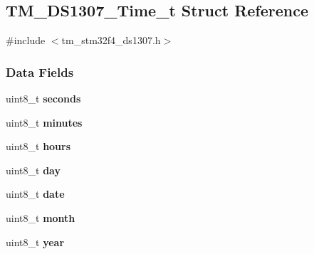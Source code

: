 \hypertarget{struct_t_m___d_s1307___time__t}{}\subsection{T\+M\+\_\+\+D\+S1307\+\_\+\+Time\+\_\+t Struct Reference}
\label{struct_t_m___d_s1307___time__t}


{\ttfamily \#include $<$tm\+\_\+stm32f4\+\_\+ds1307.\+h$>$}

\subsubsection*{Data Fields}
\begin{DoxyCompactItemize}
\item 
\hypertarget{struct_t_m___d_s1307___time__t_a46729a903be1a03cdb248fb48d84d4f5}{}uint8\+\_\+t {\bfseries seconds}\label{struct_t_m___d_s1307___time__t_a46729a903be1a03cdb248fb48d84d4f5}

\item 
\hypertarget{struct_t_m___d_s1307___time__t_a7acca8be0094a19be6e308ac05924c4f}{}uint8\+\_\+t {\bfseries minutes}\label{struct_t_m___d_s1307___time__t_a7acca8be0094a19be6e308ac05924c4f}

\item 
\hypertarget{struct_t_m___d_s1307___time__t_a00a531a34a1d603329df5778f1203ab6}{}uint8\+\_\+t {\bfseries hours}\label{struct_t_m___d_s1307___time__t_a00a531a34a1d603329df5778f1203ab6}

\item 
\hypertarget{struct_t_m___d_s1307___time__t_a72369a1087b2aeffe374bb054cb97c12}{}uint8\+\_\+t {\bfseries day}\label{struct_t_m___d_s1307___time__t_a72369a1087b2aeffe374bb054cb97c12}

\item 
\hypertarget{struct_t_m___d_s1307___time__t_a30ca8635d0267ef5190a408d7a134f7e}{}uint8\+\_\+t {\bfseries date}\label{struct_t_m___d_s1307___time__t_a30ca8635d0267ef5190a408d7a134f7e}

\item 
\hypertarget{struct_t_m___d_s1307___time__t_a3e00faf7fbf9805e9ec4d2edd6339050}{}uint8\+\_\+t {\bfseries month}\label{struct_t_m___d_s1307___time__t_a3e00faf7fbf9805e9ec4d2edd6339050}

\item 
\hypertarget{struct_t_m___d_s1307___time__t_a7af2065789bc84419b8d5fe109be83b5}{}uint8\+\_\+t {\bfseries year}\label{struct_t_m___d_s1307___time__t_a7af2065789bc84419b8d5fe109be83b5}

\end{DoxyCompactItemize}


